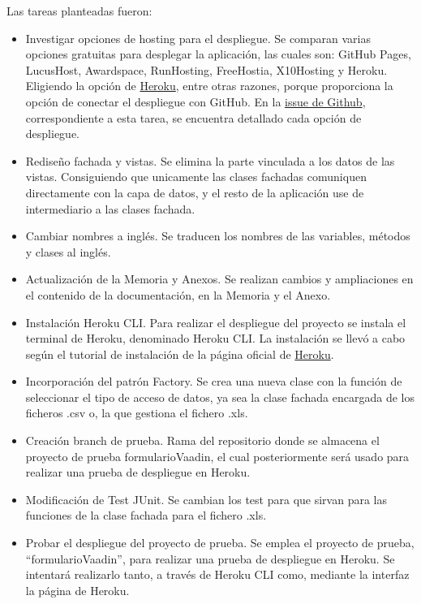 Las tareas planteadas fueron:
\begin{itemize}
	\item Investigar opciones de hosting para el despliegue. 
		Se comparan varias opciones gratuitas para desplegar la aplicación, las cuales son: GitHub Pages, LucusHost, Awardspace, RunHosting, FreeHostia, X10Hosting y Heroku. Eligiendo la opción de \href{https://dashboard.heroku.com/}{Heroku}, entre otras razones, porque proporciona la opción de conectar el despliegue con GitHub. En la \href{https://github.com/dbo1001/Gestor-TFG-2021/issues/26}{issue de Github}, correspondiente a esta tarea, se encuentra detallado cada opción de despliegue.
	\item Rediseño fachada y vistas. 
		Se elimina la parte vinculada a los datos de las vistas. Consiguiendo que unicamente las clases fachadas comuniquen directamente con la capa de datos, y el resto de la aplicación use de intermediario a las clases fachada.
	\item Cambiar nombres a inglés.
		Se traducen los nombres de las variables, métodos y clases al inglés.
	\item Actualización de la Memoria y Anexos.
		Se realizan cambios y ampliaciones en el contenido de la documentación, en la Memoria y el Anexo.
	\item Instalación Heroku CLI. 
		Para realizar el despliegue del proyecto se instala el terminal de Heroku, denominado Heroku CLI. La instalación se llevó a cabo según el tutorial de instalación de la página oficial de \href{https://devcenter.heroku.com/articles/heroku-cli}{Heroku}.
	\item Incorporación del patrón Factory. 
		Se crea una nueva clase con la función de seleccionar el tipo de acceso de datos, ya sea la clase fachada encargada de los ficheros .csv o, la que gestiona el fichero .xls.
	\item Creación branch de prueba. 
		Rama del repositorio donde se almacena el proyecto de prueba formularioVaadin, el cual posteriormente será usado para realizar una prueba de despliegue en Heroku.
	\item Modificación de Test JUnit. 
		Se cambian los test para que sirvan para las funciones de la clase fachada para el fichero .xls. 
	\item Probar el despliegue del proyecto de prueba. 
		Se emplea el proyecto de prueba, ``formularioVaadin'', para realizar una prueba de despliegue en Heroku. Se intentará realizarlo tanto, a través de Heroku CLI como, mediante la interfaz la página de Heroku.
	
\end{itemize}

